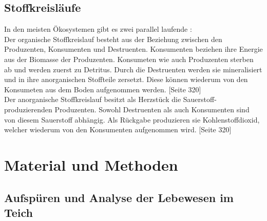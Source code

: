 \documentclass{article}
\begin{document}
    \subsection{Stoffkreisläufe}
    
        In den meisten Ökosystemen gibt es zwei parallel laufende : \\
        \vspace{5mm}
        Der organische Stoffkreislauf besteht aus der Beziehung zwischen den Produzenten, Konsumenten und Destruenten. Konsumenten beziehen ihre Energie aus der Biomasse der Produzenten. Konsumeten wie auch Produzenten sterben ab und werden zuerst zu Detritus. Durch die Destruenten werden sie mineralisiert und in ihre anorganischen Stoffteile zersetzt. Diese können wiederum von den Konsumeten aus dem Boden aufgenommen werden. \cite{Biobuch} [Seite 320] \\
        \vspace{5mm}
        Der anorganische Stoffkreislauf besitzt als Herzstück die Sauerstoff-produzierenden Produzenten. Sowohl Destruenten als auch Konsumenten sind von diesem Sauerstoff abhängig. Als Rückgabe produzieren sie Kohlenstoffdioxid, welcher wiederum von den Konsumenten aufgenommen wird. \cite{Biobuch} [Seite 320] \\


\section{Material und Methoden}
    
    \subsection{Aufspüren und Analyse der Lebewesen im Teich}
    
    
\end{document}
